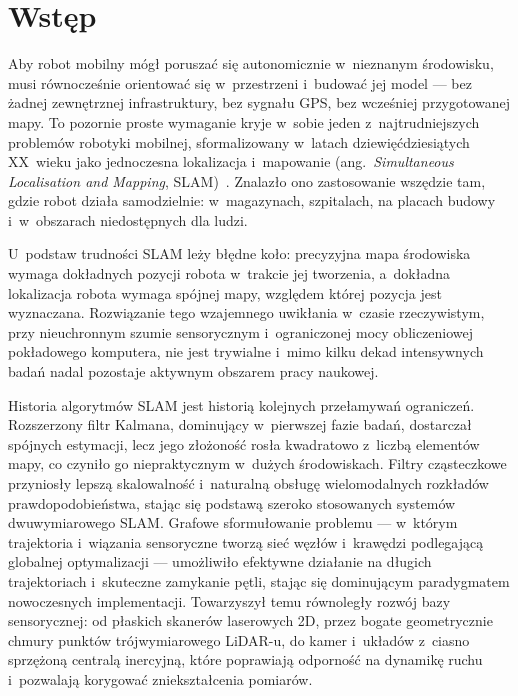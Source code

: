 \endgroup



\chapter{Wstęp}

Aby robot mobilny mógł poruszać się autonomicznie w~nieznanym środowisku,
musi równocześnie orientować się w~przestrzeni i~budować jej model ---
bez żadnej zewnętrznej infrastruktury, bez sygnału GPS, bez wcześniej
przygotowanej mapy.
To pozornie proste wymaganie kryje w~sobie jeden z~najtrudniejszych problemów
robotyki mobilnej, sformalizowany w~latach dziewięćdziesiątych XX~wieku
jako jednoczesna lokalizacja i~mapowanie
(ang.~\textit{Simultaneous Localisation and Mapping},
SLAM)~\cite{leonard1991mobile}.
Znalazło ono zastosowanie wszędzie tam, gdzie robot działa samodzielnie:
w~magazynach, szpitalach, na placach budowy i~w~obszarach niedostępnych dla ludzi.

U~podstaw trudności SLAM leży błędne koło: precyzyjna mapa środowiska wymaga
dokładnych pozycji robota w~trakcie jej tworzenia, a~dokładna lokalizacja robota
wymaga spójnej mapy, względem której pozycja jest wyznaczana.
Rozwiązanie tego wzajemnego uwikłania w~czasie rzeczywistym, przy nieuchronnym
szumie sensorycznym i~ograniczonej mocy obliczeniowej pokładowego komputera,
nie jest trywialne i~mimo kilku dekad intensywnych badań nadal pozostaje
aktywnym obszarem pracy naukowej.

Historia algorytmów SLAM jest historią kolejnych przełamywań ograniczeń.
Rozszerzony filtr Kalmana, dominujący w~pierwszej fazie badań, dostarczał
spójnych estymacji, lecz jego złożoność rosła kwadratowo z~liczbą elementów mapy,
co czyniło go niepraktycznym w~dużych środowiskach.
Filtry cząsteczkowe przyniosły lepszą skalowalność i~naturalną obsługę
wielomodalnych rozkładów prawdopodobieństwa, stając się podstawą szeroko stosowanych
systemów dwuwymiarowego SLAM.
Grafowe sformułowanie problemu --- w~którym trajektoria i~wiązania sensoryczne
tworzą sieć węzłów i~krawędzi podlegającą globalnej optymalizacji ---
umożliwiło efektywne działanie na długich trajektoriach i~skuteczne zamykanie pętli,
stając się dominującym paradygmatem nowoczesnych implementacji.
Towarzyszył temu równoległy rozwój bazy sensorycznej: od płaskich skanerów
laserowych 2D, przez bogate geometrycznie chmury punktów trójwymiarowego LiDAR-u,
do kamer i~układów z~ciasno sprzężoną centralą inercyjną, które poprawiają
odporność na dynamikę ruchu i~pozwalają korygować zniekształcenia pomiarów.

